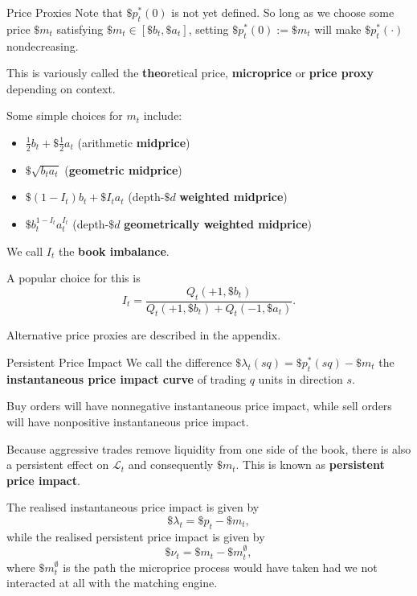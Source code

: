 \documentclass{beamer}
\begin{document}
\begin{frame}{Price Proxies}
	Note that $\$p^*_t(0)$ is not yet defined. So long as we choose some price $\$m_t$ satisfying $\$m_t\in[\$b_t,\$a_t]$, setting $\$p^*_t(0) := \$m_t$ will make $\$p^*_t(\cdot)$ nondecreasing.

	\pause

	This is variously called the \textbf{theo}retical price, \textbf{microprice} or \textbf{price proxy} depending on context.

	\pause

	Some simple choices for $m_t$ include:
	\begin{itemize}
		\item $\frac{1}{2}b_t+\$\frac{1}{2}a_t$ (arithmetic \textbf{midprice})
		\item $\$\sqrt{b_ta_t}$ (\textbf{geometric midprice})
		\item $\$(1-I_t)b_t + \$I_ta_t$ (depth-$\$d$ \textbf{weighted midprice})
		\item $\$b_t^{1-I_t}a_t^{I_t}$ (depth-$\$d$ \textbf{geometrically weighted midprice})
	\end{itemize}
	We call $I_t$ the \textbf{book imbalance}.

	\pause

	A popular choice for this is
	$$I_t=\frac{Q_t(+1,\$b_t)}{Q_t(+1,\$b_t)+Q_t(-1,\$a_t)}.$$

	Alternative price proxies are described in the appendix.
\end{frame}

\begin{frame}{Persistent Price Impact}
	We call the difference $\$\lambda_t(sq) = \$p^*_t(sq) - \$m_t$ the \textbf{instantaneous price impact curve} of trading $q$ units in direction $s$.%

	Buy orders will have nonnegative instantaneous price impact, while sell orders will have nonpositive instantaneous price impact.

	\pause

	Because aggressive trades remove liquidity from one side of the book, there is also a persistent effect on $\mathcal{L}_t$ and consequently $\$m_t$. This is known as \textbf{persistent price impact}.

	\pause

	The realised instantaneous price impact is given by
	$$\$\lambda_t = \$p_t - \$m_t,$$
	while the realised persistent price impact is given by
	$$\$\nu_t = \$m_t - \$m_t^\emptyset,$$
	where $\$m_t^\emptyset$ is the path the microprice process would have taken had we not interacted at all with the matching engine.
\end{frame}
\end{document}

